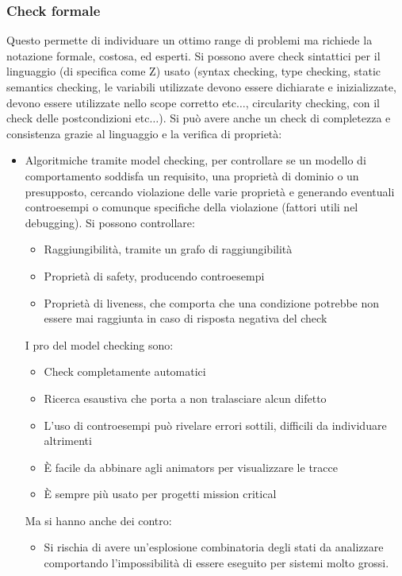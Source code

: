 \subsubsection{Check formale}
Questo permette di individuare un ottimo range di problemi ma richiede la notazione formale, costosa, ed esperti. Si possono avere check sintattici per il linguaggio (di specifica come Z) usato (syntax checking, type checking, static semantics checking, le variabili utilizzate devono essere dichiarate e inizializzate, devono essere utilizzate nello scope corretto etc$\dots$, circularity checking, con il check delle postcondizioni etc$\dots$). Si può avere anche un check di completezza e consistenza grazie al linguaggio e la verifica di proprietà:
\begin{itemize}
    \item Algoritmiche tramite model checking, per controllare se un modello di comportamento soddisfa un requisito, una proprietà di dominio o un presupposto, cercando violazione delle varie proprietà e generando eventuali controesempi o comunque specifiche della violazione (fattori utili nel debugging). Si possono controllare:
    \begin{itemize}
        \item Raggiungibilità, tramite un grafo di raggiungibilità
        \item Proprietà di safety, producendo controesempi
        \item Proprietà di liveness, che comporta che una condizione potrebbe non essere mai raggiunta in caso di risposta negativa del check
    \end{itemize}   
    I pro del model checking sono:
    \begin{itemize}
        \item Check completamente automatici 
        \item Ricerca esaustiva che porta a non tralasciare alcun difetto
        \item L'uso di controesempi può rivelare errori sottili, difficili da individuare altrimenti
        \item È facile da abbinare agli animators per visualizzare le tracce
        \item È sempre più usato per progetti mission critical
    \end{itemize}
    Ma si hanno anche dei contro:
    \begin{itemize}
        \item Si rischia di avere un'esplosione combinatoria degli stati da analizzare comportando l'impossibilità di essere eseguito per sistemi molto grossi.

\end{itemize}
\end{itemize}

